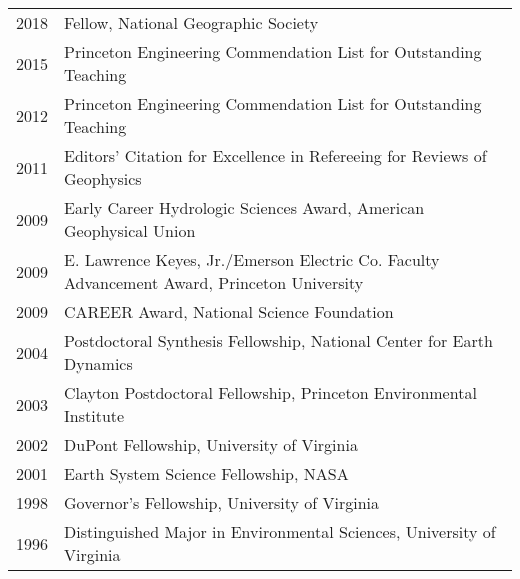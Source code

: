 \documentclass[10pt]{report}
\begin{document}
\begin{tabular}{l l}

2018 & Fellow, National Geographic Society \\
2015 & Princeton Engineering Commendation List for Outstanding Teaching \\
2012 & Princeton Engineering Commendation List for Outstanding Teaching \\ 
2011 & Editors' Citation for Excellence in Refereeing for Reviews of Geophysics \\
2009 & Early Career Hydrologic Sciences Award, American Geophysical Union \\  
2009 & E. Lawrence Keyes, Jr./Emerson Electric Co. Faculty Advancement Award, Princeton University \\
2009 & CAREER Award, National Science Foundation \\
2004 & Postdoctoral Synthesis Fellowship, National Center for Earth Dynamics \\
2003 & Clayton Postdoctoral Fellowship, Princeton Environmental Institute \\
2002 & DuPont Fellowship, University of Virginia \\
2001 & Earth System Science Fellowship, NASA \\
1998 & Governor's Fellowship, University of Virginia \\
1996 & Distinguished Major in Environmental Sciences, University of Virginia \\
\end{tabular}
\end{document}
